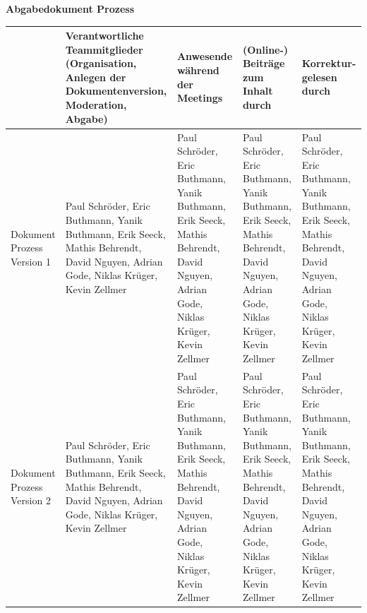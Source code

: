 \documentclass{article}
\begin{document}
\begin{titlepage}
	{
		\centering
		\huge
		\textbf{Abgabedokument Prozess}\\
	}
	\vspace{1cm}
	\begin{table}[h]
		\centering
		\footnotesize
		\begin{tabular}{| p{1.5cm} | p{2.5cm} | p{2cm} | p{2cm} | p{2cm} |}
			\hline
			                           & Verantwortliche Teammitglieder (Organisation, Anlegen der Dokumentenversion, Moderation, Abgabe)                                   & Anwesende während der Meetings                                                                                                     & (Online-) Beiträge zum Inhalt durch                                                                                                & Korrektur-gelesen durch                                                                                                            \\
			\hline
			Dokument Prozess Version 1 & Paul Schröder, Eric Buthmann, Yanik Buthmann, Erik Seeck, Mathis Behrendt, David Nguyen, Adrian Gode, Niklas Krüger, Kevin Zellmer & Paul Schröder, Eric Buthmann, Yanik Buthmann, Erik Seeck, Mathis Behrendt, David Nguyen, Adrian Gode, Niklas Krüger, Kevin Zellmer & Paul Schröder, Eric Buthmann, Yanik Buthmann, Erik Seeck, Mathis Behrendt, David Nguyen, Adrian Gode, Niklas Krüger, Kevin Zellmer & Paul Schröder, Eric Buthmann, Yanik Buthmann, Erik Seeck, Mathis Behrendt, David Nguyen, Adrian Gode, Niklas Krüger, Kevin Zellmer \\
			\hline
			Dokument Prozess Version 2 & Paul Schröder, Eric Buthmann, Yanik Buthmann, Erik Seeck, Mathis Behrendt, David Nguyen, Adrian Gode, Niklas Krüger, Kevin Zellmer & Paul Schröder, Eric Buthmann, Yanik Buthmann, Erik Seeck, Mathis Behrendt, David Nguyen, Adrian Gode, Niklas Krüger, Kevin Zellmer & Paul Schröder, Eric Buthmann, Yanik Buthmann, Erik Seeck, Mathis Behrendt, David Nguyen, Adrian Gode, Niklas Krüger, Kevin Zellmer & Paul Schröder, Eric Buthmann, Yanik Buthmann, Erik Seeck, Mathis Behrendt, David Nguyen, Adrian Gode, Niklas Krüger, Kevin Zellmer \\
			\hline
		\end{tabular}
	\end{table}
\end{titlepage}
\end{document}
